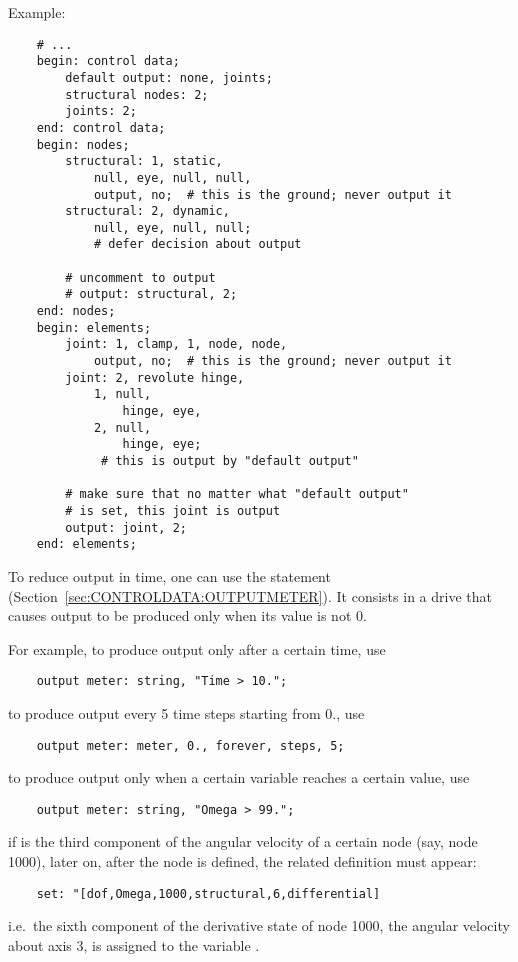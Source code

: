 \noindent
Example:
\begin{verbatim}
    # ...
    begin: control data;
        default output: none, joints;
        structural nodes: 2;
        joints: 2;
    end: control data;
    begin: nodes;
        structural: 1, static,
            null, eye, null, null,
            output, no;  # this is the ground; never output it
        structural: 2, dynamic,
            null, eye, null, null;
            # defer decision about output

        # uncomment to output
        # output: structural, 2;
    end: nodes;
    begin: elements;
        joint: 1, clamp, 1, node, node,
            output, no;  # this is the ground; never output it
        joint: 2, revolute hinge,
            1, null,
                hinge, eye,
            2, null,
                hinge, eye;
             # this is output by "default output"

        # make sure that no matter what "default output"
        # is set, this joint is output
        output: joint, 2;
    end: elements;
\end{verbatim}


To reduce output in time, one can use the  statement
(Section~\ref{sec:CONTROLDATA:OUTPUTMETER}).
It consists in a drive that causes output to be produced only when 
its value is not 0.

For example, to produce output only after a certain time, use
\begin{verbatim}
    output meter: string, "Time > 10.";
\end{verbatim}
to produce output every 5 time steps starting from 0., use
\begin{verbatim}
    output meter: meter, 0., forever, steps, 5;
\end{verbatim}
to produce output only when a certain variable reaches a certain value, use
\begin{verbatim}
    output meter: string, "Omega > 99.";
\end{verbatim}
if  is the third component of the angular velocity 
of a certain node (say, node 1000), later on, after the node is defined, 
the related definition must appear:
\begin{verbatim}
    set: "[dof,Omega,1000,structural,6,differential]
\end{verbatim}
i.e.\ the sixth component of the derivative state of node 1000,
the angular velocity about axis 3, is assigned to the variable .

